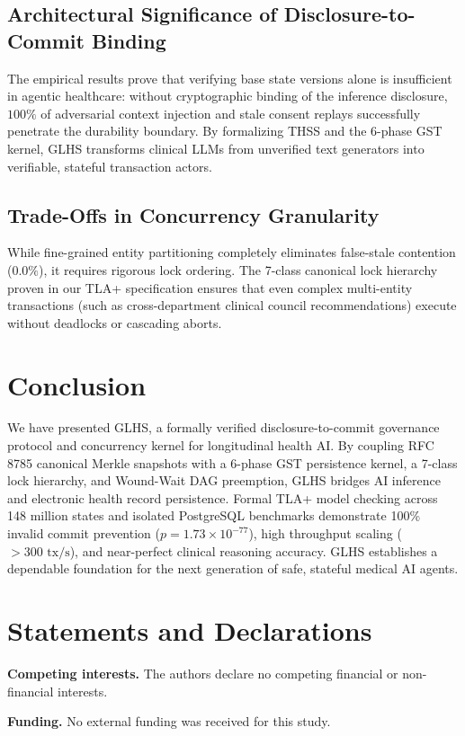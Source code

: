 \documentclass[11pt,a4paper]{article}
\begin{document}
\subsection{Architectural Significance of Disclosure-to-Commit Binding}
The empirical results prove that verifying base state versions alone is insufficient in agentic healthcare: without cryptographic binding of the inference disclosure, $100\%$ of adversarial context injection and stale consent replays successfully penetrate the durability boundary. By formalizing THSS and the 6-phase GST kernel, GLHS transforms clinical LLMs from unverified text generators into verifiable, stateful transaction actors.

\subsection{Trade-Offs in Concurrency Granularity}
While fine-grained entity partitioning completely eliminates false-stale contention ($0.0\%$), it requires rigorous lock ordering. The 7-class canonical lock hierarchy proven in our TLA+ specification ensures that even complex multi-entity transactions (such as cross-department clinical council recommendations) execute without deadlocks or cascading aborts.

\section{Conclusion}
We have presented GLHS, a formally verified disclosure-to-commit governance protocol and concurrency kernel for longitudinal health AI. By coupling RFC 8785 canonical Merkle snapshots with a 6-phase GST persistence kernel, a 7-class lock hierarchy, and Wound-Wait DAG preemption, GLHS bridges AI inference and electronic health record persistence. Formal TLA+ model checking across 148 million states and isolated PostgreSQL benchmarks demonstrate 100\% invalid commit prevention ($p = 1.73 \times 10^{-77}$), high throughput scaling ($>300\text{ tx/s}$), and near-perfect clinical reasoning accuracy. GLHS establishes a dependable foundation for the next generation of safe, stateful medical AI agents.

\section*{Statements and Declarations}
\textbf{Competing interests.} The authors declare no competing financial or non-financial interests.

\textbf{Funding.} No external funding was received for this study.
\end{document}
